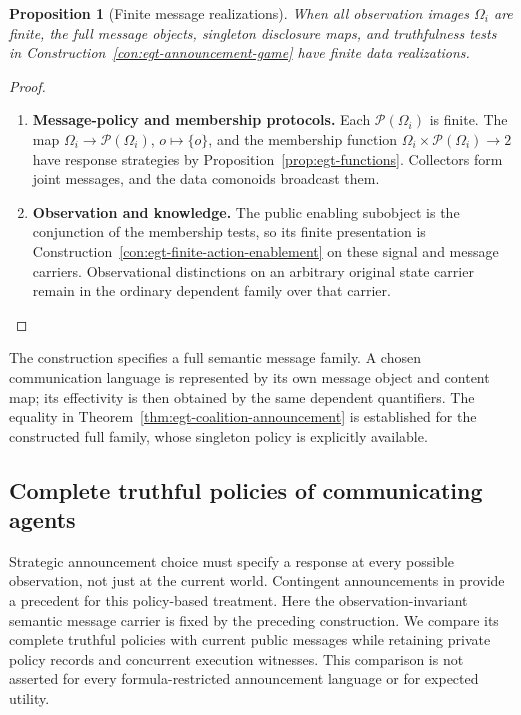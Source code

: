 \documentclass[11pt,a4paper]{article}
\numberwithin{equation}{section}
\newtheorem{proposition}[theorem]{Proposition}
\theoremstyle{definition}
\theoremstyle{remark}
\theoremstyle{plain}
\begin{document}
\begin{proposition}[Finite message realizations]
\label{prop:egt-finite-announcement-messages}
When all observation images $\Omega_i$ are finite, the full message
objects, singleton disclosure maps, and truthfulness tests in
Construction~\ref{con:egt-announcement-game} have finite data realizations.
\end{proposition}
\begin{proof}
\leavevmode
\begin{enumerate}[label=\textup{(\arabic*)},leftmargin=*,itemsep=4pt,topsep=3pt]
  \item \textbf{Message-policy and membership protocols.} Each $\mathcal P(\Omega_i)$ is finite. The map
$\Omega_i\to\mathcal P(\Omega_i)$, $o\mapsto\{o\}$, and the
membership function $\Omega_i\times\mathcal P(\Omega_i)\to2$
have response strategies by Proposition~\ref{prop:egt-functions}. Collectors form joint messages, and the data comonoids broadcast them.
  \item \textbf{Observation and knowledge.} The public enabling subobject is the conjunction of the membership tests,
so its finite presentation is
Construction~\ref{con:egt-finite-action-enablement} on these signal and
message carriers. Observational distinctions on an arbitrary original
state carrier remain in the ordinary dependent family over that carrier.
\end{enumerate}
\end{proof}

The construction specifies a full semantic message family. A chosen
communication language is represented by its own message object and
content map; its effectivity is then obtained by the same dependent
quantifiers. The equality in
Theorem~\ref{thm:egt-coalition-announcement} is established for the
constructed full family, whose singleton policy is explicitly available.

\subsection{Complete truthful policies of communicating agents}
\label{sec:egt-complete-announcement-policies}

Strategic announcement choice must specify a response at every
possible observation, not just at the current world. Contingent
announcements in \citet{AgotnesVanDitmarsch2011AnnouncementGames}
provide a precedent for this policy-based treatment. Here the
observation-invariant semantic message carrier is fixed by the preceding
construction. We compare its complete truthful policies with current
public messages while retaining private policy records and concurrent
execution witnesses. This comparison is not asserted for every
formula-restricted announcement language or for expected utility.
\end{document}
